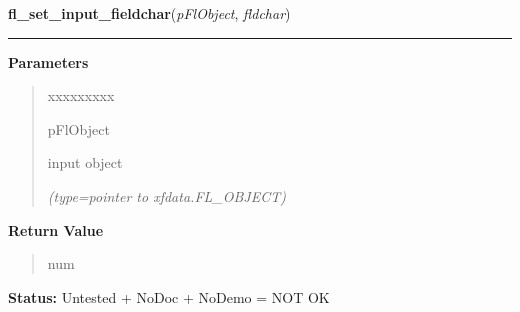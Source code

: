 \hspace{.8\funcindent}\begin{boxedminipage}{\funcwidth}

    \raggedright \textbf{fl\_set\_input\_fieldchar}(\textit{pFlObject}, \textit{fldchar})

    \vspace{-1.5ex}

    \rule{\textwidth}{0.5\fboxrule}
\setlength{\parskip}{2ex}
\setlength{\parskip}{1ex}
      \textbf{Parameters}
      \vspace{-1ex}

      \begin{quote}
        \begin{Ventry}{xxxxxxxxx}

          \item[pFlObject]

          input object

            {\it (type=pointer to xfdata.FL\_OBJECT)}

        \end{Ventry}

      \end{quote}

      \textbf{Return Value}
    \vspace{-1ex}

      \begin{quote}
      num

      \end{quote}

\textbf{Status:} Untested + NoDoc + NoDemo = NOT OK



    \end{boxedminipage}

    \label{xformslib:flinput:fl_get_input_topline}

    \vspace{0.5ex}

